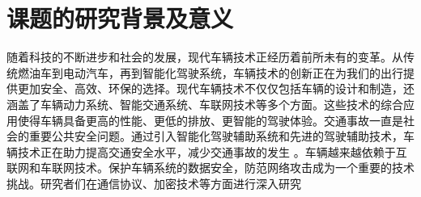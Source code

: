 \section{课题的研究背景及意义}\label{section1-1}

\textcolor[RGB]{202,12,22}{}
随着科技的不断进步和社会的发展，现代车辆技术正经历着前所未有的变革。从传统燃油车到电动汽车，再到智能化驾驶系统，车辆技术的创新正在为我们的出行提供更加安全、高效、环保的选择。现代车辆技术不仅仅包括车辆的设计和制造，还涵盖了车辆动力系统、智能交通系统、车联网技术等多个方面。这些技术的综合应用使得车辆具备更高的性能、更低的排放、更智能的驾驶体验。交通事故一直是社会的重要公共安全问题。通过引入智能化驾驶辅助系统和先进的驾驶辅助技术，车辆技术正在助力提高交通安全水平，减少交通事故的发生 \cite{SecurityandPrivacy}。车辆越来越依赖于互联网和车联网技术。保护车辆系统的数据安全，防范网络攻击成为一个重要的技术挑战。研究者们在通信协议、加密技术等方面进行深入研究
